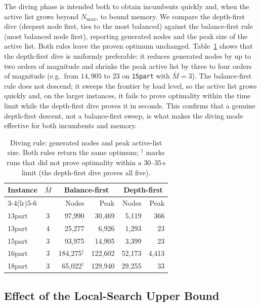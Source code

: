 \documentclass[letterpaper, 10 pt, conference]{ieeeconf}  %
\begin{document}
The diving phase is intended both to obtain incumbents quickly and, when the
active list grows beyond $N_{\max}$, to bound memory. We compare the depth-first
dive (deepest node first, ties to the most balanced) against the balance-first
rule (most balanced node first), reporting generated nodes and the peak size of
the active list. Both rules leave the proven optimum unchanged.
Table~\ref{tab:dive} shows that the depth-first dive is uniformly preferable: it
reduces generated nodes by up to two orders of magnitude and shrinks the peak
active list by three to four orders of magnitude (e.g.\ from $14{,}905$ to $23$
on \texttt{15part} with $\bar M=3$). The balance-first rule does not descend; it
sweeps the frontier by load level, so the active list grows quickly and, on the
larger instances, it fails to prove optimality within the time limit while the
depth-first dive proves it in seconds. This confirms that a genuine depth-first
descent, not a balance-first sweep, is what makes the diving mode effective for
both incumbents and memory.

\begin{table}[t]
\centering
\caption{Diving rule: generated nodes and peak active-list size. Both rules
return the same optimum; $^\dagger$ marks runs that did not prove optimality
within a $30$--$35$\,s limit (the depth-first dive proves all five).}
\label{tab:dive}
\begin{tabular}{l c r r r r}
\toprule
\multirow{2}{*}{Instance} & \multirow{2}{*}{$\bar M$}
 & \multicolumn{2}{c}{Balance-first} & \multicolumn{2}{c}{Depth-first} \\
\cmidrule(lr){3-4}\cmidrule(lr){5-6}
 & & Nodes & Peak & Nodes & Peak \\
\midrule
13part & 3 & 97{,}990            & 30{,}469  & 5{,}119  & 366 \\
13part & 4 & 25{,}277            & 6{,}926   & 1{,}293  & 23 \\
15part & 3 & 93{,}975            & 14{,}905  & 3{,}399  & 23 \\
16part & 3 & 184{,}275$^\dagger$ & 122{,}602 & 52{,}173 & 4{,}413 \\
18part & 3 & 65{,}022$^\dagger$  & 129{,}940 & 29{,}255 & 33 \\
\bottomrule
\end{tabular}
\end{table}

\subsection{Effect of the Local-Search Upper Bound}
\label{subsec:res_ls}
\end{document}
